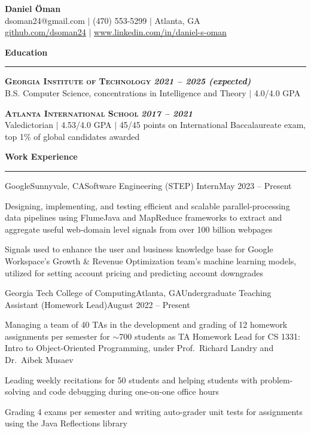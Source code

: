 \documentclass{article}
\newcommand{\horizontal}{\vspace{2pt}\hrule}
\newcommand{\school}[3]{\vspace{2pt}\textsc{\textbf{#1}} \hfill \textbf{\textit{#2}} \\ #3}
\newcommand{\sectitle}[1]{\vspace{2pt} \textbf{\large #1} \horizontal}
\begin{document}
\thispagestyle{empty}
\begin{center}
    \textbf{\LARGE Daniel Öman} \\
    dsoman24@gmail.com $|$ (470) 553-5299 $|$ Atlanta, GA \\
    \href{https://github.com/dsoman24}{github.com/dsoman24} $|$ \href{https://www.linkedin.com/in/daniel-s-oman/}{www.linkedin.com/in/daniel-s-oman}
\end{center}

\begin{flushleft}
\sectitle{Education}

\school{Georgia Institute of Technology}{2021 -- 2025 (expected)}
{B.S. Computer Science, concentrations in Intelligence and Theory $|$ 4.0/4.0 GPA}

\school{Atlanta International School}{2017 -- 2021}
{Valedictorian $|$ 4.53/4.0 GPA $|$ 45/45 points on International Baccalaureate exam, top 1\% of global candidates awarded}

\sectitle{Work Experience}

    \begin{experience}{Google}{Sunnyvale, CA}{Software Engineering (STEP) Intern}{May 2023 -- Present}
        \item Designing, implementing, and testing efficient and scalable parallel-processing data pipelines using FlumeJava and MapReduce frameworks to extract and aggregate useful web-domain level signals from over 100 billion webpages
        \item Signals used to enhance the user and business knowledge base for Google Workspace's Growth \& Revenue Optimization team's machine learning models, utilized for setting account pricing and predicting account downgrades
    \end{experience}

    \begin{experience}{Georgia Tech College of Computing}{Atlanta, GA}{Undergraduate Teaching Assistant (Homework Lead)}{August 2022 -- Present}
        \item Managing a team of 40 TAs in the development and grading of 12 homework assignments per semester for $\sim$700 students as TA Homework Lead for CS 1331: Intro to Object-Oriented Programming, under Prof.~Richard Landry and Dr.~Aibek Musaev
        \item Leading weekly recitations for 50 students and helping students with problem-solving and code debugging during one-on-one office hours
        \item Grading 4 exams per semester and writing auto-grader unit tests for assignments using the Java Reflections library
    \end{experience}


\end{flushleft}
\end{document}
